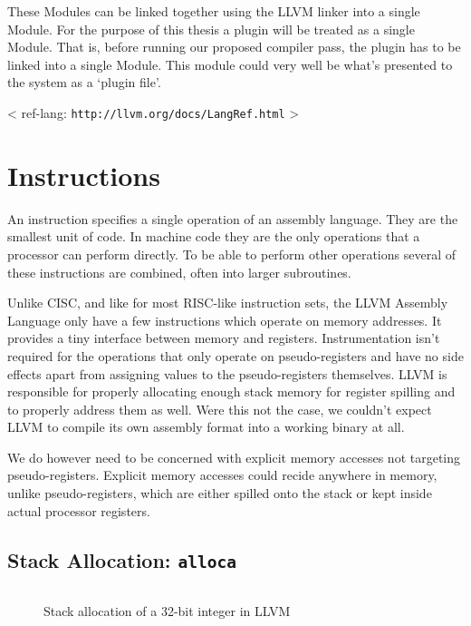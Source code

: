 These Modules can be linked together using the LLVM linker into a single Module.
For the purpose of this thesis a plugin will be treated as a single Module.
That is, before running our proposed compiler pass, the plugin has to be linked
into a single Module.
This module could very well be what's presented to the system as a
`plugin file'.

< ref-lang: \texttt{http://llvm.org/docs/LangRef.html} >


\section {Instructions}

An instruction specifies a single operation of an assembly language.
They are the smallest unit of code.
In machine code they are the only operations that a processor can perform
directly.
To be able to perform other operations several of these instructions are
combined, often into larger subroutines.

Unlike CISC, and like for most RISC-like instruction sets, the LLVM Assembly
Language only have a few instructions which operate on memory addresses.
It provides a tiny interface between memory and registers.
Instrumentation isn't required for the operations that only operate on
pseudo-registers and have no side effects apart from assigning values to the
pseudo-registers themselves.
LLVM is responsible for properly allocating enough stack memory for register
spilling and to properly address them as well.
Were this not the case, we couldn't expect LLVM to compile its own assembly
format into a working binary at all.

We do however need to be concerned with explicit memory accesses not targeting
pseudo-registers.
Explicit memory accesses could recide anywhere in memory, unlike
pseudo-registers, which are either spilled onto the stack or kept inside actual
processor registers.

\subsection {Stack Allocation: \texttt{alloca}}

\begin{figure}[ht]
\begin{lstlisting}[language=llvm]
%ptr = alloca i32                               ; yields {i32*}:ptr
\end{lstlisting}
\caption{Stack allocation of a 32-bit integer in LLVM}
\end{figure}


